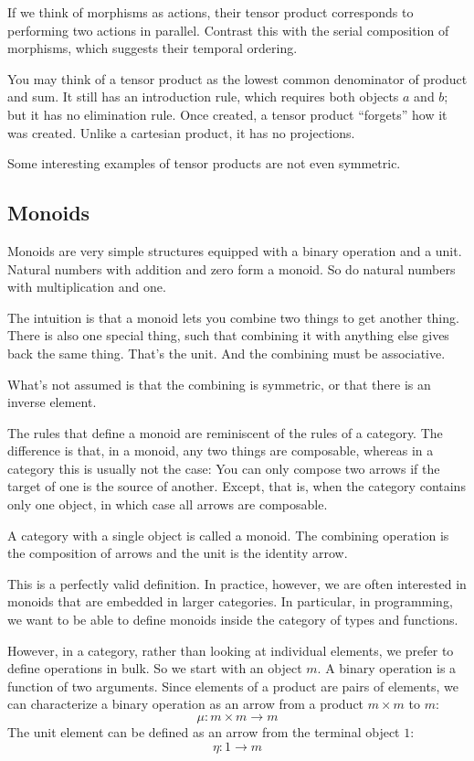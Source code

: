 \documentclass[DaoFP]{subfiles}
\begin{document}
If we think of morphisms as actions, their tensor product corresponds to performing two actions in parallel. Contrast this with the serial composition of morphisms, which suggests their temporal ordering.

You may think of a tensor product as the lowest common denominator of product and sum. It still has an introduction rule, which requires both objects $a$ and $b$; but it has no elimination rule. Once created, a tensor product ``forgets'' how it was created. Unlike a cartesian product, it has no projections. 

Some interesting examples of tensor products are not even symmetric. 

\subsection{Monoids}

Monoids are very simple structures equipped with a binary operation and a unit. Natural numbers with addition and zero form a monoid. So do natural numbers with multiplication and one. 

The intuition is that a monoid lets you combine two things to get another thing. There is also one special thing, such that combining it with anything else gives back the same thing. That's the unit. And the combining must be associative. 

What's not assumed is that the combining is symmetric, or that there is an inverse element.

The rules that define a monoid are reminiscent of the rules of a category. The difference is that, in a monoid, any two things are composable, whereas in a category this is usually not the case: You can only compose two arrows if the target of one is the source of another. Except, that is, when the category contains only one object, in which case all arrows are composable.

A category with a single object is called a monoid. The combining operation is the composition of arrows and the unit is the identity arrow. 

This is a perfectly valid definition. In practice, however, we are often interested in monoids that are embedded in larger categories. In particular, in programming, we want to be able to define monoids inside the category of types and functions. 

However, in a category, rather than looking at individual elements, we prefer to define operations in bulk. So we start with an object $m$. A binary operation is a function of two arguments. Since elements of a product are pairs of elements, we can characterize a binary operation as an arrow from a product $m \times m$ to $m$:
\[ \mu \colon m \times m \to m \]
The unit element can be defined as an arrow from the terminal object $1$:
\[ \eta \colon 1 \to m \]
\end{document}
